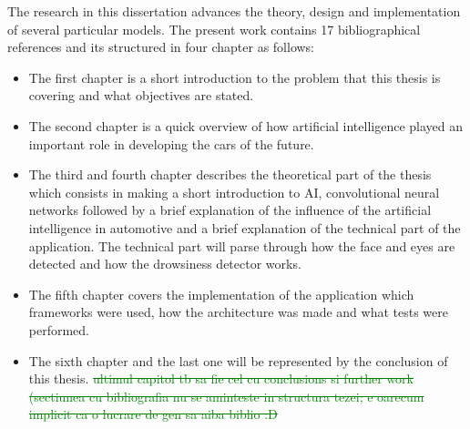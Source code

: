The research in this dissertation advances the theory, design and implementation of several particular models. The present work contains 17 bibliographical references and its structured in four chapter as follows:
\begin{itemize}
  \item The first chapter is a short introduction to the problem that this thesis is covering and what objectives are stated. 
  \item The second chapter is a quick overview of how artificial intelligence played an important role in developing the cars of the future.
  \item The third and fourth chapter describes the theoretical part of the thesis which consists in making a short introduction to AI, convolutional neural networks followed by a brief explanation of the influence of the artificial intelligence in automotive and a brief explanation of the technical part of the application. The technical part will parse through how the face and eyes are detected and how the drowsiness detector works.
  \item The fifth chapter covers the implementation of the application which frameworks were used, how the architecture was made and what tests were performed.
  \item The sixth chapter and the last one will be represented by the conclusion of this thesis. \textcolor{green}{\sout{ultimul capitol tb sa fie cel cu conclusions si further work (sectiunea cu bibliografia nu se aminteste in structura tezei; e oarecum implicit ca o lucrare de gen sa aiba biblio :D}}
  
\end{itemize}